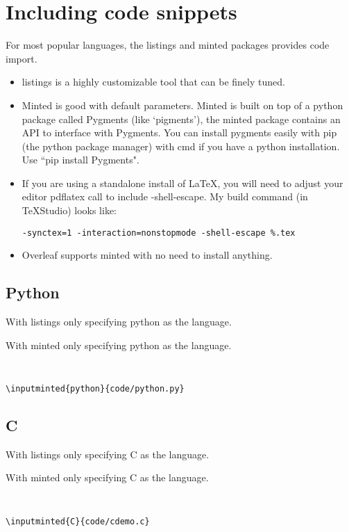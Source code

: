 \documentclass[11pt]{article}
\begin{document}
\section{Including code snippets}
For most popular languages, the listings and minted packages provides code import. 
\begin{itemize}
	\item listings is a highly customizable tool that can be finely tuned. 
	\item Minted is good with default parameters. Minted is built on top of a python package called Pygments (like `pigments'), the minted package contains an API to interface with Pygments. You can install pygments easily with pip (the python package manager) with cmd if you have a python installation. Use ``pip install Pygments". 
	\item If you are using a standalone install of \LaTeX{}, you will need to adjust your editor pdflatex call to include -shell-escape. My build command (in TeXStudio) looks like:
\begin{verbatim}
-synctex=1 -interaction=nonstopmode -shell-escape %.tex
\end{verbatim}
	\item Overleaf supports minted with no need to install anything.
\end{itemize} 
\subsection{Python}
With listings only specifying python as the language.

With minted only specifying python as the language.
\inputminted{python}{code/python.py}
\begin{verbatim}

\inputminted{python}{code/python.py}
\end{verbatim}
\subsection{C}
With listings only specifying C as the language.

With minted only specifying C as the language.
\inputminted{C}{code/cdemo.c}
\begin{verbatim}

\inputminted{C}{code/cdemo.c}
\end{verbatim}
\end{document}
